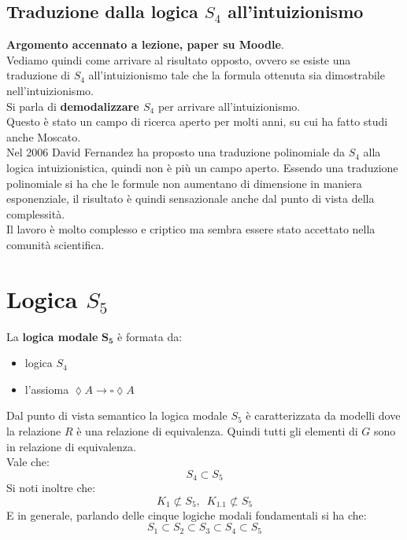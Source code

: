 \documentclass[a4paper,12pt, oneside]{book}
\begin{document}
\subsection{Traduzione dalla logica $S_4$ all'intuizionismo}
\textbf{Argomento accennato a lezione, paper su Moodle}.\\
Vediamo quindi come arrivare al risultato opposto, ovvero se esiste una
traduzione di $S_4$ all'intuizionismo tale che la formula ottenuta sia
dimostrabile nell'intuizionismo.\\
Si parla di \textbf{demodalizzare $S_4$} per arrivare all'intuizionismo.\\
Questo è stato un campo di ricerca aperto per molti anni, su cui ha fatto studi
anche Moscato.\\
Nel 2006 David Fernandez ha proposto una traduzione polinomiale da $S_4$ alla
logica intuizionistica, quindi non è più un campo aperto. Essendo una
traduzione polinomiale si ha che le formule non aumentano di dimensione in
maniera 
esponenziale, il risultato è quindi sensazionale anche dal punto di vista della
complessità.\\ 
Il lavoro è molto complesso e criptico ma sembra essere stato accettato nella
comunità scientifica.
\newpage
\section{Logica $S_5$}
La \textbf{logica modale} $\mathbf{S_5}$ è formata da:
\begin{itemize}
  \item logica $S_4$
  \item l'assioma $\lozenge A\to \square\lozenge A$
\end{itemize}
Dal punto di vista semantico la logica modale $S_5$ è caratterizzata da modelli
dove la relazione $R$ è una relazione di equivalenza. Quindi tutti gli elementi
di $G$ sono in relazione di equivalenza.\\
Vale che:
\[S_4\subset S_5\]
Si noti inoltre che:
\[K_1\not\subset S_5,\,\,\,K_{1.1}\not\subset S_5\]
E in generale, parlando delle cinque logiche modali fondamentali si ha che:
\[S_1\subset S_2\subset S_3\subset S_4\subset S_5\]
\end{document}
